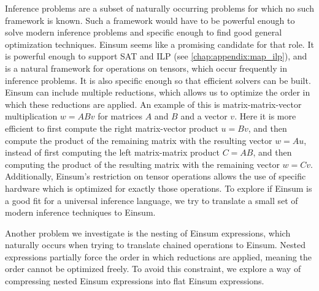 Inference problems are a subset of naturally occurring problems for which no such framework is known.
Such a framework would have to be powerful enough to solve modern inference problems and specific enough to find good general optimization techniques.
Einsum seems like a promising candidate for that role.
It is powerful enough to support SAT \cite{Biamonte2014} and ILP (see \cref{chap:appendix:map_ilp}), and is a natural framework for operations on tensors, which occur frequently in inference problems.
It is also specific enough so that efficient solvers can be built.
Einsum can include multiple reductions, which allows us to optimize the order in which these reductions are applied.
An example of this is matrix-matrix-vector multiplication $w = A B v$ for matrices $A$ and $B$ and a vector $v$.
Here it is more efficient to first compute the right matrix-vector product $u = Bv$, and then compute the product of the remaining matrix with the resulting vector $w = Au$,
instead of first computing the left matrix-matrix product $C = AB$, and then computing the product of the resulting matrix with the remaining vector $w = Cv$.
Additionally, Einsum's restriction on tensor operations allows the use of specific hardware which is optimized for exactly those operations.
To explore if Einsum is a good fit for a universal inference language,
we try to translate a small set of modern inference techniques to Einsum.

Another problem we investigate is the nesting of Einsum expressions, which naturally occurs when trying to translate chained operations to Einsum.
Nested expressions partially force the order in which reductions are applied, meaning the order cannot be optimized freely.
To avoid this constraint, we explore a way of compressing nested Einsum expressions into flat Einsum expressions.